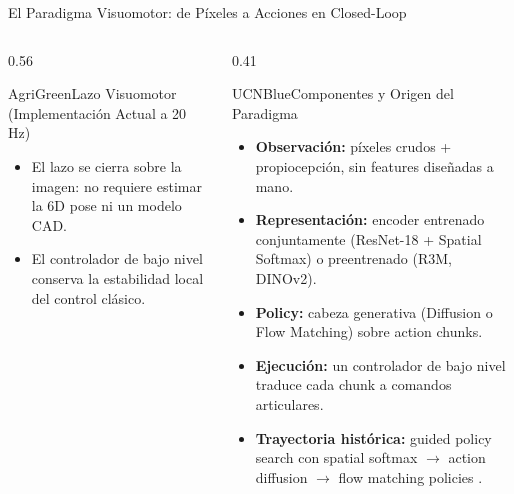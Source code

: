 \documentclass[aspectratio=169,10pt,xcolor={dvipsnames,table}]{beamer}
\newcommand{\CardHeightDouble}{42.5mm}     %
\newcommand{\CheckMark}{\textcolor{AgriGreen}{$\checkmark$}}
\newcommand{\NoteFont}{\fontsize{5.6}{6.9}\selectfont}                  %
\begin{document}
\begin{frame}{El Paradigma Visuomotor: de Píxeles a Acciones en Closed-Loop}
\begin{columns}[T, onlytextwidth]
\begin{column}{0.56\textwidth}
\begin{Card}[height=\CardHeightDouble]{AgriGreen}{Lazo Visuomotor (Implementación Actual a 20 Hz)}
{\begin{itemize}
          \item[\CheckMark] El lazo se cierra sobre la imagen: no requiere estimar la 6D pose ni un modelo CAD.
          \item[\CheckMark] El controlador de bajo nivel conserva la estabilidad local del control clásico.
        \end{itemize}}
      \end{Card}
    \end{column}
    \begin{column}{0.41\textwidth}
      \begin{Card}[height=\CardHeightDouble]{UCNBlue}{Componentes y Origen del Paradigma}
        {\NoteFont
        \begin{itemize}\setlength{\itemsep}{0.4pt}
          \item[\textcolor{UCNBlue}{$\blacksquare$}] \textbf{Observación:} píxeles crudos + propiocepción, sin features diseñadas a mano.
          \item[\textcolor{UCNBlue}{$\blacksquare$}] \textbf{Representación:} encoder entrenado conjuntamente (ResNet-18 + Spatial Softmax) o preentrenado (R3M, DINOv2).
          \item[\textcolor{UCNBlue}{$\blacksquare$}] \textbf{Policy:} cabeza generativa (Diffusion o Flow Matching) sobre action chunks.
          \item[\textcolor{UCNBlue}{$\blacksquare$}] \textbf{Ejecución:} un controlador de bajo nivel traduce cada chunk a comandos articulares.
          \item[\textcolor{UCNBlue}{$\blacksquare$}] \textbf{Trayectoria histórica:} guided policy search con spatial softmax \cite{levine2016end} $\to$ action diffusion \cite{chi2025diffusion} $\to$ flow matching policies \cite{fang2025flowpolicy,ding2025rfmp}.
        \end{itemize}}
      \end{Card}
    \end{column}
  \end{columns}
\end{frame}
\end{document}

